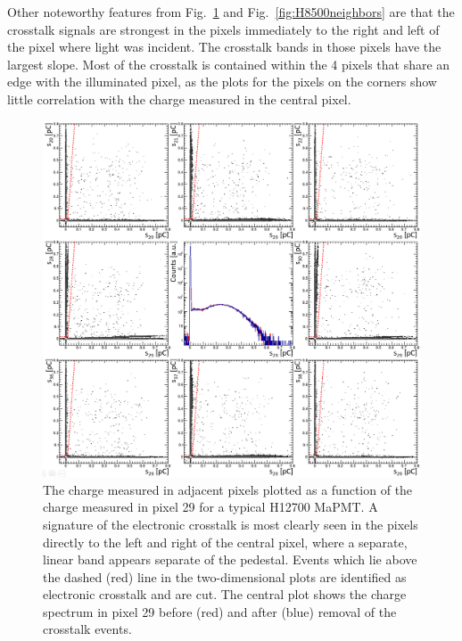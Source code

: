 Other noteworthy features from Fig.~\ref{fig:H12700neighbors} and Fig.~\ref{fig:H8500neighbors} are that the crosstalk signals are strongest in the pixels immediately to the right and left of the pixel where light was incident. The crosstalk bands in those pixels have the largest slope. Most of the crosstalk is contained within the 4 pixels that share an edge with the illuminated pixel, as the plots for the pixels on the corners show little correlation with the charge measured in the central pixel.

\begin{figure}[h!bt]
	\centering
	\includegraphics[width=0.9\linewidth]{figures/H12700_ct_v2.png}
	\caption{The charge measured in adjacent pixels plotted as a function of the charge measured in pixel 29 for a typical H12700 MaPMT. A signature of the electronic crosstalk is most clearly seen in the pixels directly to the left and right of the central pixel, where a separate, linear band appears separate of the pedestal. Events which lie above the dashed (red) line in the two-dimensional plots are identified as electronic crosstalk and are cut. The central plot shows the charge spectrum in pixel 29 before (red) and after (blue) removal of the crosstalk events.}
	\label{fig:H12700neighbors}
\end{figure}

